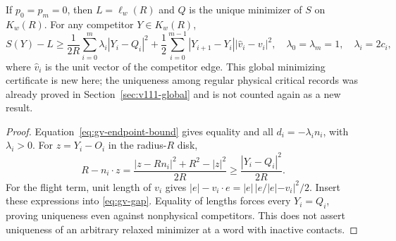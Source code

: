 \begin{corollary}
\label{cor:gv-critical}
If $p_0=p_m=0$, then $L=\ell_w(R)$ and $Q$ is the unique minimizer
of $S$ on $K_w(R)$. For any competitor $Y\in K_w(R)$,
\begin{equation}\label{eq:gv-critical-gap}
 S(Y)-L\ge
 \frac1{2R}\sum_{i=0}^m\lambda_i|Y_i-Q_i|^2
 +\frac12\sum_{i=0}^{m-1}|Y_{i+1}-Y_i|
       |\widehat v_i-v_i|^2,
 \quad \lambda_0=\lambda_m=1,\quad\lambda_i=2c_i,
\end{equation}
where $\widehat v_i$ is the unit vector of the competitor edge.
This global minimizing certificate is new here; the uniqueness among
regular physical critical records was already proved in
Section~\ref{sec:v111-global} and is not counted again as a new result.
\end{corollary}
\begin{proof}
Equation~\eqref{eq:gv-endpoint-bound} gives equality and all
$d_i=-\lambda_i n_i$, with $\lambda_i>0$.
For $z=Y_i-O_i$ in the radius-$R$ disk,
\[
 R-n_i\cdot z
 =\frac{|z-Rn_i|^2+R^2-|z|^2}{2R}
 \ge\frac{|Y_i-Q_i|^2}{2R}.
\]
For the flight term, unit length of $v_i$ gives
$|e|-v_i\cdot e=|e|\,|e/|e|-v_i|^2/2$.
Insert these expressions into \eqref{eq:gv-gap}. Equality of lengths
forces every $Y_i=Q_i$, proving uniqueness even against nonphysical
competitors. This does not assert uniqueness of an arbitrary relaxed
minimizer at a word with inactive contacts.
\end{proof}
